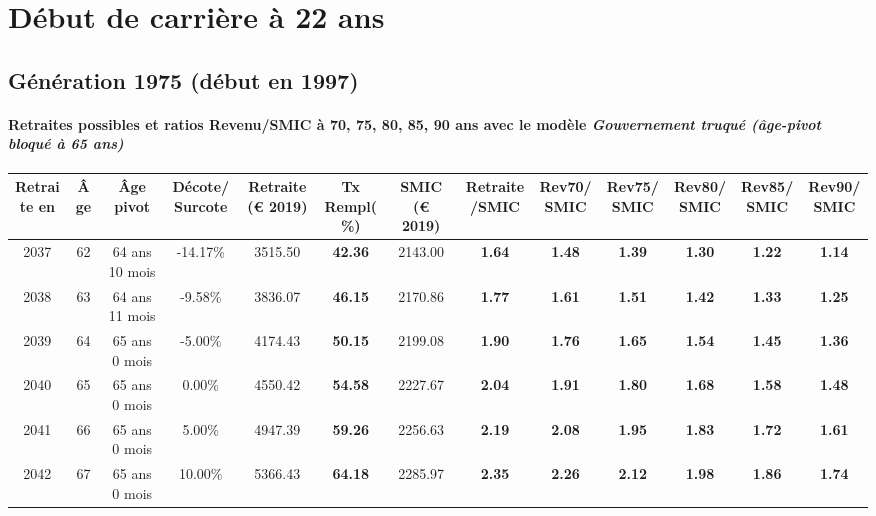 \addto{\captionsenglish}{ \renewcommand{\mtctitle}{}} \setcounter{minitocdepth}{2} 
 \minitoc \newpage 

\section{Début de carrière à 22 ans} 

\subsection{Génération 1975 (début en 1997)} 

\paragraph{Retraites possibles et ratios Revenu/SMIC à 70, 75, 80, 85, 90 ans avec le modèle \emph{Gouvernement truqué (âge-pivot bloqué à 65 ans)}}  
 
{ \scriptsize \begin{center} 
\begin{tabular}[htb]{|c|c||c|c||c|c||c||c|c|c|c|c|c|} 
\hline 
 Retraite en &  Âge &  Âge pivot &  Décote/Surcote &  Retraite (\euro{} 2019) &  Tx Rempl(\%) &  SMIC (\euro{} 2019) &  Retraite/SMIC &  Rev70/SMIC &  Rev75/SMIC &  Rev80/SMIC &  Rev85/SMIC &  Rev90/SMIC \\ 
\hline \hline 
 2037 &  62 &  64 ans 10 mois &  -14.17\% &  3515.50 &  {\bf 42.36} &  2143.00 &  {\bf 1.64} &  {\bf 1.48} &  {\bf 1.39} &  {\bf 1.30} &  {\bf 1.22} &  {\bf 1.14} \\ 
\hline 
 2038 &  63 &  64 ans 11 mois &  -9.58\% &  3836.07 &  {\bf 46.15} &  2170.86 &  {\bf 1.77} &  {\bf 1.61} &  {\bf 1.51} &  {\bf 1.42} &  {\bf 1.33} &  {\bf 1.25} \\ 
\hline 
 2039 &  64 &  65 ans 0 mois &  -5.00\% &  4174.43 &  {\bf 50.15} &  2199.08 &  {\bf 1.90} &  {\bf 1.76} &  {\bf 1.65} &  {\bf 1.54} &  {\bf 1.45} &  {\bf 1.36} \\ 
\hline 
 2040 &  65 &  65 ans 0 mois &  0.00\% &  4550.42 &  {\bf 54.58} &  2227.67 &  {\bf 2.04} &  {\bf 1.91} &  {\bf 1.80} &  {\bf 1.68} &  {\bf 1.58} &  {\bf 1.48} \\ 
\hline 
 2041 &  66 &  65 ans 0 mois &  5.00\% &  4947.39 &  {\bf 59.26} &  2256.63 &  {\bf 2.19} &  {\bf 2.08} &  {\bf 1.95} &  {\bf 1.83} &  {\bf 1.72} &  {\bf 1.61} \\ 
\hline 
 2042 &  67 &  65 ans 0 mois &  10.00\% &  5366.43 &  {\bf 64.18} &  2285.97 &  {\bf 2.35} &  {\bf 2.26} &  {\bf 2.12} &  {\bf 1.98} &  {\bf 1.86} &  {\bf 1.74} \\ 
\hline 
\hline 
\end{tabular} 
\end{center} } 
